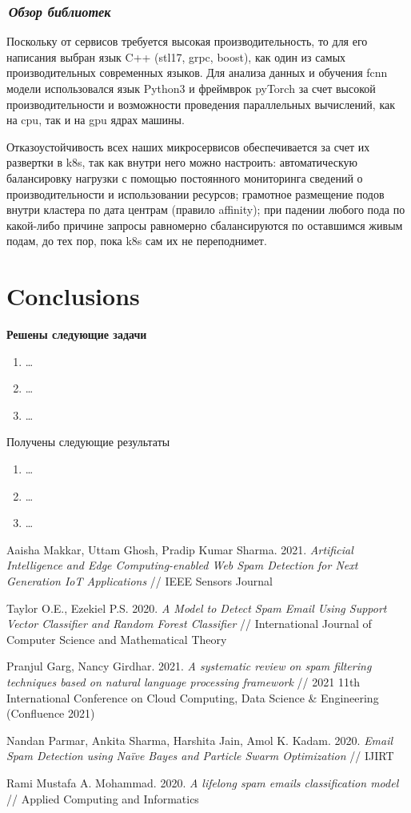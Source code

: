 \documentclass[12pt]{article}
\begin{document}
\subsubsection*{\it\,Обзор библиотек}

Поскольку от сервисов требуется высокая производительность, то для его написания выбран язык C++ (stl17, grpc, boost), как один из самых производительных современных языков. Для анализа данных и обучения fcnn модели использовался язык Python3 и фреймврок pyTorch за счет высокой производительности и возможности проведения параллельных вычислений, как на cpu, так и на gpu ядрах машины.

Отказоустойчивость всех наших микросервисов обеспечивается за счет их развертки в k8s, так как внутри него можно настроить: автоматическую балансировку нагрузки с помощью постоянного мониторинга сведений о производительности и использовании ресурсов; грамотное размещение подов внутри кластера по дата центрам (правило affinity); при падении любого пода по какой-либо причине запросы равномерно сбалансируются по оставшимся живым подам, до тех пор, пока k8s сам их не переподнимет.


\section{Conclusions}
{
\bf\color{amaranth}
Решены следующие задачи
\begin{enumerate}
	\item \ldots
	\item \ldots
	\item \ldots
\end{enumerate}

Получены следующие результаты
\begin{enumerate}
\item \ldots
\item \ldots
\item \ldots
\end{enumerate}
}

\begin{thebibliography}{99}
Aaisha Makkar, Uttam Ghosh, Pradip Kumar Sharma.
2021. \emph{Artificial Intelligence and Edge Computing-enabled
	Web Spam Detection for Next Generation IoT
	Applications} // IEEE Sensors Journal

Taylor O.E., Ezekiel P.S.
2020. \emph{A Model to Detect Spam Email Using Support Vector Classifier and Random Forest Classifier} //
International Journal of Computer Science and Mathematical Theory

Pranjul Garg, Nancy Girdhar.
2021. \emph{A systematic review on spam filtering techniques based on
natural language processing framework} // 2021 11th International Conference on Cloud Computing, Data Science \& Engineering (Confluence 2021)

Nandan Parmar, Ankita Sharma, Harshita Jain, Amol K. Kadam.
2020. \emph{Email Spam Detection using Naïve Bayes and Particle Swarm Optimization} // IJIRT

Rami Mustafa A. Mohammad.
2020. \emph{A lifelong spam emails 	classification model} //
Applied Computing and Informatics
\end{thebibliography}
\end{document}
